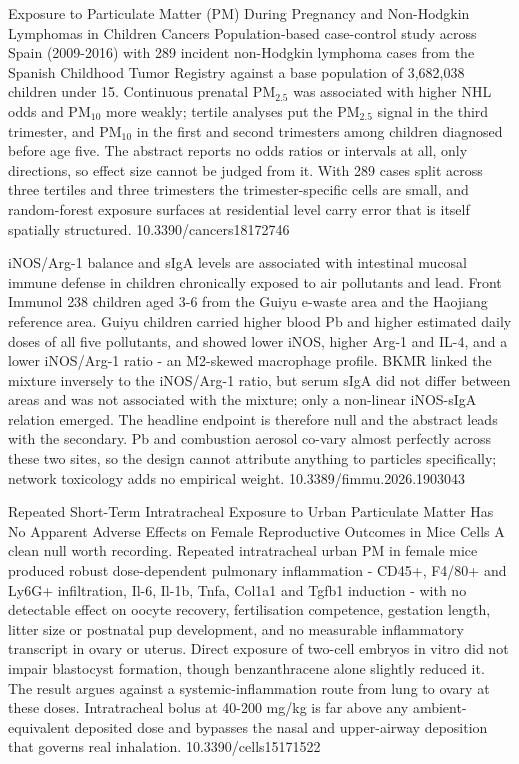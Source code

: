 \documentclass[10pt]{article}
\begin{document}

{Exposure to Particulate Matter (PM) During Pregnancy and Non-Hodgkin Lymphomas in Children}
{Cancers}
{Population-based case-control study across Spain (2009-2016) with 289 incident non-Hodgkin lymphoma cases from the Spanish Childhood Tumor Registry against a base population of 3,682,038 children under 15. Continuous prenatal PM$_{2.5}$ was associated with higher NHL odds and PM$_{10}$ more weakly; tertile analyses put the PM$_{2.5}$ signal in the third trimester, and PM$_{10}$ in the first and second trimesters among children diagnosed before age five. The abstract reports no odds ratios or intervals at all, only directions, so effect size cannot be judged from it. With 289 cases split across three tertiles and three trimesters the trimester-specific cells are small, and random-forest exposure surfaces at residential level carry error that is itself spatially structured.}
{10.3390/cancers18172746}


{iNOS/Arg-1 balance and sIgA levels are associated with intestinal mucosal immune defense in children chronically exposed to air pollutants and lead.}
{Front Immunol}
{238 children aged 3-6 from the Guiyu e-waste area and the Haojiang reference area. Guiyu children carried higher blood Pb and higher estimated daily doses of all five pollutants, and showed lower iNOS, higher Arg-1 and IL-4, and a lower iNOS/Arg-1 ratio - an M2-skewed macrophage profile. BKMR linked the mixture inversely to the iNOS/Arg-1 ratio, but serum sIgA did not differ between areas and was not associated with the mixture; only a non-linear iNOS-sIgA relation emerged. The headline endpoint is therefore null and the abstract leads with the secondary. Pb and combustion aerosol co-vary almost perfectly across these two sites, so the design cannot attribute anything to particles specifically; network toxicology adds no empirical weight.}
{10.3389/fimmu.2026.1903043}

{Repeated Short-Term Intratracheal Exposure to Urban Particulate Matter Has No Apparent Adverse Effects on Female Reproductive Outcomes in Mice}
{Cells}
{A clean null worth recording. Repeated intratracheal urban PM in female mice produced robust dose-dependent pulmonary inflammation - CD45+, F4/80+ and Ly6G+ infiltration, Il-6, Il-1b, Tnfa, Col1a1 and Tgfb1 induction - with no detectable effect on oocyte recovery, fertilisation competence, gestation length, litter size or postnatal pup development, and no measurable inflammatory transcript in ovary or uterus. Direct exposure of two-cell embryos in vitro did not impair blastocyst formation, though benzanthracene alone slightly reduced it. The result argues against a systemic-inflammation route from lung to ovary at these doses. Intratracheal bolus at 40-200 mg/kg is far above any ambient-equivalent deposited dose and bypasses the nasal and upper-airway deposition that governs real inhalation.}
{10.3390/cells15171522}
\end{document}
